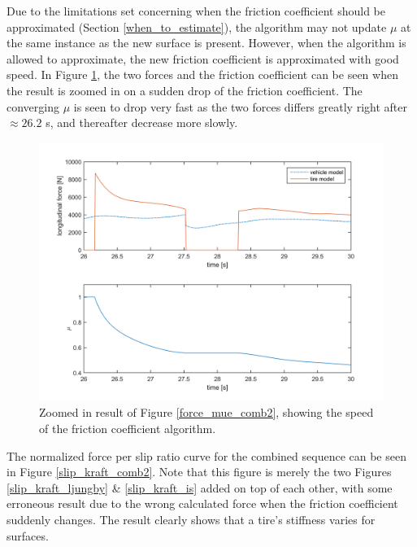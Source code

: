 Due to the limitations set concerning when the friction coefficient should be approximated (Section \ref{when_to_estimate}), the algorithm may not update $ \mu $ at the same instance as the new surface is present. However, when the algorithm is allowed to approximate, the new friction coefficient is approximated with good speed. In Figure \ref{force_mue_comb2_zoom}, the two forces and the friction coefficient can be seen when the result is zoomed in on a sudden drop of the friction coefficient. The converging $ \mu $ is seen to drop very fast as the two forces differs greatly right after $ \approx 26.2 $ s, and thereafter decrease more slowly. 

\begin{figure}[h]
	\centering
	\includegraphics[width=1.0\textwidth]{Pictures/force_mue_comb2_zoom}
	\caption {Zoomed in result of Figure \ref{force_mue_comb2}, showing the speed of the friction coefficient algorithm.}
	\label{force_mue_comb2_zoom}
\end{figure}

The normalized force per slip ratio curve for the combined sequence can be seen in Figure \ref{slip_kraft_comb2}. Note that this figure is merely the two Figures \ref{slip_kraft_ljungby} \& \ref{slip_kraft_is} added on top of each other, with some erroneous result due to the wrong calculated force when the friction coefficient suddenly changes. The result clearly shows that a tire's stiffness varies for surfaces.

